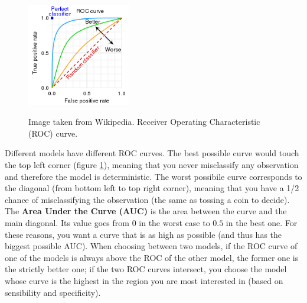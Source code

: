 \begin{figure}[H]
\caption{Image taken from Wikipedia. Receiver Operating Characteristic (ROC) curve.}
\centering
\includegraphics[width=0.4\textwidth]{RocCurve}
\label{ROCcurve}
\end{figure}

    Different models have different ROC curves. The best possible curve would
    touch the top left corner (figure \ref{ROCcurve}), meaning that you never
    misclassify any observation and therefore the model is deterministic. The
    worst possibile curve corresponds to the diagonal (from bottom left to top
    right corner), meaning that you have a 1/2 chance of misclassifying the
    observation (the same as tossing a coin to decide). The \textbf{Area Under
    the Curve (AUC)} is the area between the curve and the main diagonal. Its
    value goes from $0$ in the worst case to $0.5$ in the best one. For these
    reasons, you want a curve that is as high as possible (and thus has the
    biggest possible AUC). When choosing between two models, if the ROC curve of
    one of the models is always above the ROC of the other model, the former one
    is the strictly better one; if the two ROC curves intersect, you choose the
    model whose curve is the highest in the region you are most interested in
    (based on sensibility and specificity).    
  